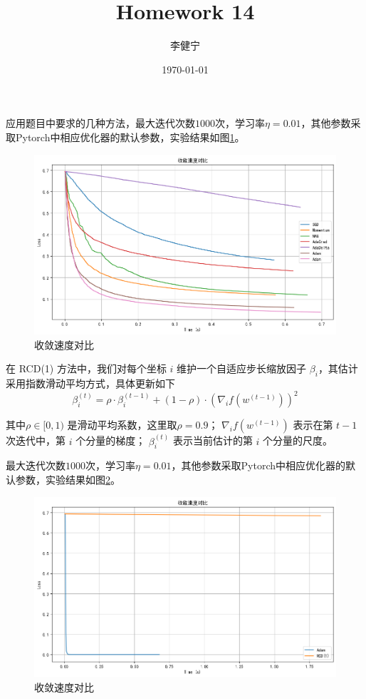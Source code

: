 \documentclass{homework}
\author{李健宁}
\date{\today}
\title{Homework 14}
\begin{document}
 \maketitle

\question

\begin{sol}
应用题目中要求的几种方法，最大迭代次数$1000$次，学习率$\eta = 0.01$，其他参数采取Pytorch中相应优化器的默认参数，实验结果如图\ref{1}。

\begin{figure}[h]
    \centering
    \includegraphics[width=0.5\linewidth]{1.png}
    \caption{收敛速度对比}
    \label{1}
\end{figure}

\end{sol}


\question
\begin{sol}
    
在 RCD(1) 方法中，我们对每个坐标 \( i \) 维护一个自适应步长缩放因子 \( \beta_i \)，其估计采用指数滑动平均方式，具体更新如下
\begin{equation}
\beta_i^{(t)} = \rho \cdot \beta_i^{(t-1)} + (1 - \rho) \cdot \left( \nabla_i f(w^{(t-1)}) \right)^2
\end{equation}

其中\( \rho \in [0,1) \) 是滑动平均系数，这里取\( \rho = 0.9 \)； \( \nabla_i f(w^{(t-1)}) \) 表示在第 \(t-1\) 次迭代中，第 \(i\) 个分量的梯度； \( \beta_i^{(t)} \) 表示当前估计的第 \(i\) 个分量的尺度。

最大迭代次数$1000$次，学习率$\eta = 0.01$，其他参数采取Pytorch中相应优化器的默认参数，实验结果如图\ref{2}。

\begin{figure}
    \centering
    \includegraphics[width=0.5\linewidth]{2.png}
    \caption{收敛速度对比}
    \label{2}
\end{figure}
\end{sol}
\end{document}
